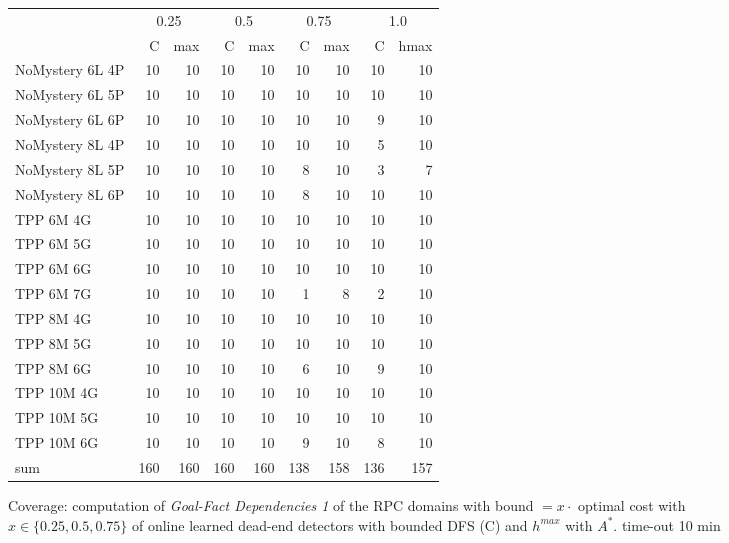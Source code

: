 \setlength{\tabcolsep}{1pt}
\begin{figure}[ht]
	\centering
	\scriptsize
	\begin{tabular}{l|rr|rr|rr|rr}
			& \multicolumn{2}{c}{0.25} & \multicolumn{2}{|c}{0.5} & \multicolumn{2}{|c}{0.75}& \multicolumn{2}{|c}{1.0}\\
		& C & max & C & max & C & max & C & hmax\\\hline
		NoMystery 6L 4P & 10 & 10 & 10 & 10 & 10 & 10 & 10 & 10\\
		NoMystery 6L 5P & 10 & 10 & 10 & 10 & 10 & 10 & 10 & 10\\
		NoMystery 6L 6P & 10 & 10 & 10 & 10 & 10 & 10 & 9 & 10\\
		NoMystery 8L 4P & 10 & 10 & 10 & 10 & 10 & 10 & 5 & 10\\
		NoMystery 8L 5P & 10 & 10 & 10 & 10 & 8 & 10 & 3 & 7\\
		NoMystery 8L 6P & 10 & 10 & 10 & 10 & 8 & 10 & 10 & 10\\
		TPP 6M 4G & 10 & 10 & 10 & 10 & 10 & 10 & 10 & 10\\
		TPP 6M 5G & 10 & 10 & 10 & 10 & 10 & 10 & 10 & 10\\
		TPP 6M 6G & 10 & 10 & 10 & 10 & 10 & 10 & 10 & 10\\
		TPP 6M 7G & 10 & 10 & 10 & 10 & 1 & 8 & 2 & 10\\
		TPP 8M 4G & 10 & 10 & 10 & 10 & 10 & 10 & 10 & 10\\
		TPP 8M 5G & 10 & 10 & 10 & 10 & 10 & 10 & 10 & 10\\
		TPP 8M 6G & 10 & 10 & 10 & 10 & 6 & 10 & 9 & 10\\
		TPP 10M 4G & 10 & 10 & 10 & 10 & 10 & 10 & 10 & 10\\
		TPP 10M 5G & 10 & 10 & 10 & 10 & 10 & 10 & 10 & 10\\
		TPP 10M 6G & 10 & 10 & 10 & 10 & 9 & 10 & 8 & 10\\\hline
		sum \numtasks{160} & 160 & 160 & 160 & 160 & 138 & 158 & 136 & 157\\
	\end{tabular}
	\caption{Coverage: computation of \emph{Goal-Fact Dependencies 1} of the RPC 
		domains with bound $ = x \cdot $ optimal cost with $ x \in \{0.25, 0.5, 0.75\}$
	of online learned dead-end detectors with bounded DFS (C) and $h^{max}$ with $A^*$. 
	time-out 10 min}
\end{figure}

